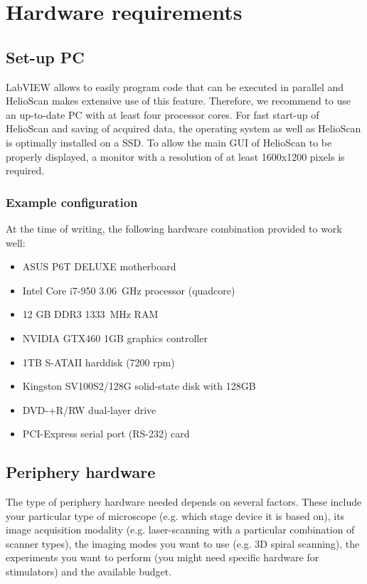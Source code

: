 \section{Hardware requirements}

\subsection{Set-up PC}
LabVIEW allows to easily program code that can be executed in parallel and HelioScan makes extensive use of this feature. Therefore, we recommend to use an up-to-date PC with at least four processor cores. For fast start-up of HelioScan and saving of acquired data, the operating system as well as HelioScan is optimally installed on a \ac{SSD}. To allow the main \ac{GUI} of HelioScan to be properly displayed, a monitor with a resolution of at least 1600x1200 pixels is required. 

\subsubsection{Example configuration}
At the time of writing, the following hardware combination provided to work well:
\begin{itemize}[noitemsep]
	\item ASUS P6T DELUXE motherboard
	\item Intel Core i7-950 \SI{3.06}{\GHz} processor (quadcore)
	\item 12 GB DDR3 \SI{1333}{\MHz} RAM
	\item NVIDIA GTX460 1GB graphics controller
	\item 1TB S-ATAII harddisk (7200 rpm)
	\item Kingston SV100S2/128G solid-state disk with 128GB
	\item DVD-+R/RW dual-layer drive
	\item PCI-Express serial port (RS-232) card
\end{itemize}

\subsection{Periphery hardware}
The type of periphery hardware needed depends on several factors. These include your particular type of microscope (e.g. which stage device it is based on), its image acquisition modality  (e.g. laser-scanning with a particular combination of scanner types), the imaging modes you want to use (e.g. 3D spiral scanning), the experiments you want to perform (you might need specific hardware for stimulators) and the available budget.